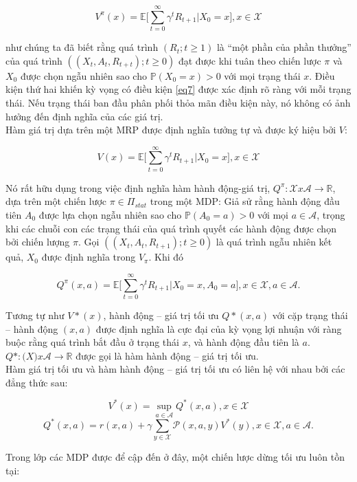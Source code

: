 \documentclass[14pt,a4paper,oneside]{report}		%
\begin{document}
\begin{equation} \label{eq7}
V^\pi(x)=\mathbb{E}\bigg[\displaystyle\sum^\infty_{t=0}{\gamma^tR_{t+1}|X_0=x}\bigg], x\in\mathcal{X}
\end{equation}


như chúng ta đã biết rằng quá trình $(R_t ; t\geq 1)$ là “một phần của phần thưởng” của quá trình $((X_t,A_t,R_{t+t});t\geq 0)$ đạt được khi tuân theo chiến lược $\pi$ và $X_0$ được chọn ngẫu nhiên sao cho $\mathbb{P}(X_0=x)>0$ với mọi trạng thái $x$. Điều kiện thứ hai khiến kỳ vọng có điều kiện \ref{eq7} được xác định rõ ràng với mỗi trạng thái. Nếu trạng thái ban đầu phân phối thỏa mãn điều kiện này, nó không có ảnh hưởng đến định nghĩa của các giá trị.\\
Hàm giá trị dựa trên một MRP được định nghĩa tưởng tự và được ký hiệu bởi $V$:

$$V(x)=\mathbb{E}\bigg[\displaystyle\sum^\infty_{t=0}{\gamma^tR_{t+1}|X_0=x}\bigg], x\in\mathcal{X}$$

Nó rất hữu dụng trong việc định nghĩa hàm hành động-giá trị, $Q^\pi:\mathcal{X}x\mathcal{A}\rightarrow\mathbb{R}$, dựa trên một chiến lược $\pi\in\Pi_{stat}$ trong một MDP: Giả sử rằng hành động đầu tiên $A_0$ được lựa chọn ngẫu nhiên sao cho $\mathbb{P}(A_0=a)>0$ với mọi $a\in\mathcal{A}$, trọng khi các chuỗi con các trạng thái của quá trình quyết các hành động được chọn bởi chiến lượng $\pi$. Gọi $((X_t,A_t,R_{t+1});t\geq0)$ là quá trình ngẫu nhiên kết quả, $X_0$ được định nghĩa trong $V_\pi$. Khi đó

$$Q^\pi(x,a) =\mathbb{E}\bigg[\displaystyle\sum^\infty_{t=0}{\gamma^tR_{t+1}|X_0=x,A_0=a}\bigg], x\in\mathcal{X}, a\in\mathcal{A}.$$

Tương tự như $V*(x)$, hành động – giá trị tối ưu $Q*(x,a)$ với cặp trạng thái – hành động $(x,a)$ được định nghĩa là cực đại của kỳ vọng lợi nhuận với ràng buộc rằng quá trình bắt đầu ở trạng thái $x$, và hành động đầu tiên là $a$. $Q*:\mathcal(X)x\mathcal{A}\rightarrow\mathbb{R}$ được gọi là hàm hành động – giá trị tối ưu.\\
Hàm giá trị tối ưu và hàm hành động – giá trị tối ưu có liên hệ với nhau bởi các đẳng thức sau:

$$V^*(x) = \displaystyle\sup_{a\in\mathcal{A}} Q^*(x,a),  x\in\mathcal{X}$$
$$Q^*(x,a) = r(x,a) + \gamma \displaystyle\sum_{y\in\mathcal{X}}{\mathcal{P}(x,a,y)V^*(y)}, x\in\mathcal{X}, a\in\mathcal{A}.$$

Trong lớp các MDP được để cập đến ở đây, một chiến lược dừng tối ưu luôn tồn tại:
\end{document}
